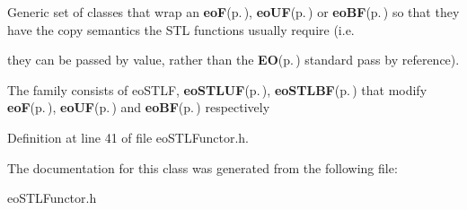 Generic set of classes that wrap an {\bf eo\-F}{\rm (p.\,\pageref{classeo_f})}, {\bf eo\-UF}{\rm (p.\,\pageref{classeo_u_f})} or {\bf eo\-BF}{\rm (p.\,\pageref{classeo_b_f})} so that they have the copy semantics the STL functions usually require (i.e. 

they can be passed by value, rather than the {\bf EO}{\rm (p.\,\pageref{class_e_o})} standard pass by reference).

The family consists of eo\-STLF, {\bf eo\-STLUF}{\rm (p.\,\pageref{classeo_s_t_l_u_f})}, {\bf eo\-STLBF}{\rm (p.\,\pageref{classeo_s_t_l_b_f})} that modify {\bf eo\-F}{\rm (p.\,\pageref{classeo_f})}, {\bf eo\-UF}{\rm (p.\,\pageref{classeo_u_f})} and {\bf eo\-BF}{\rm (p.\,\pageref{classeo_b_f})} respectively 



Definition at line 41 of file eo\-STLFunctor.h.

The documentation for this class was generated from the following file:\begin{CompactItemize}
\item 
eo\-STLFunctor.h\end{CompactItemize}
